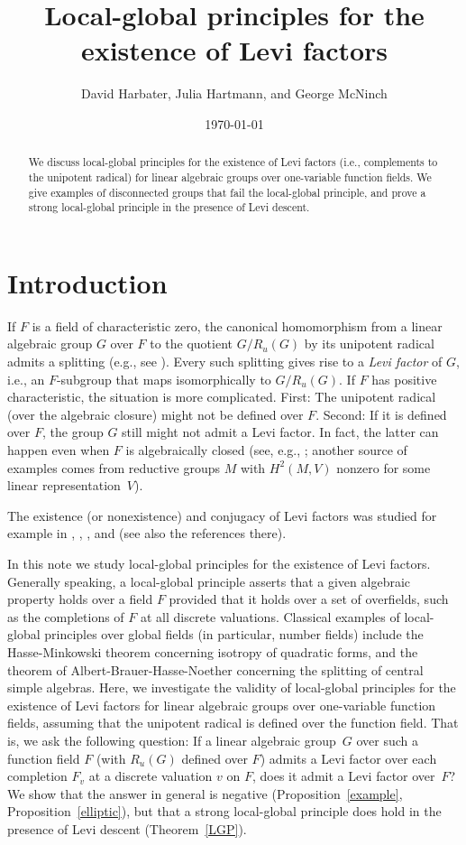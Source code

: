 \documentclass[12pt]{amsart}
\title{Local-global principles for the existence of Levi factors}
\author{David Harbater, Julia Hartmann, and George McNinch}
\date{\today}
\theoremstyle{plain}
\theoremstyle{definition}
\theoremstyle{remark}
\begin{document}
\maketitle

\begin{abstract}
We discuss local-global principles for the existence of Levi factors (i.e., complements to the unipotent radical) for linear algebraic groups over one-variable function fields. We give examples of disconnected groups that fail the local-global principle, and prove a strong local-global principle in the presence of Levi descent.
\end{abstract}


\section{Introduction}
If $F$ is a field of characteristic zero, the canonical homomorphism from a linear algebraic group $G$ over $F$ to the quotient $G/R_u(G)$ by its unipotent radical admits a splitting (e.g., see \cite[Section~3.1]{McNinch10}). Every such splitting gives rise to a {\em Levi factor} of $G$, i.e., an $F$-subgroup that maps isomorphically to $G/R_u(G)$. If $F$ has positive characteristic, the situation is more complicated. First: The unipotent radical (over the algebraic closure) might not be defined over $F$. Second: If it is defined over $F$, the group $G$ still might not admit a Levi factor. In fact, the latter can happen even when $F$ is algebraically closed (see, e.g., \cite[Proposition~A.6.4]{CGP}; another source of examples comes from reductive groups $M$ with $H^2(M,V)$ nonzero for some linear representation~$V$). 

The existence (or nonexistence) and conjugacy of Levi factors was studied for example in \cite{Humphreys}, \cite{McNinch10}, \cite{McNinch13}, and \cite{McNinch} (see also the references there).

In this note we study local-global principles for the existence of Levi factors.  Generally speaking, a local-global principle asserts that a given algebraic property holds over a field $F$ provided that it holds over a set of overfields, such as the completions of $F$ at all discrete valuations.  Classical examples of local-global principles over global fields (in particular, number fields) include the Hasse-Minkowski theorem concerning isotropy of quadratic forms, and the theorem of Albert-Brauer-Hasse-Noether concerning the splitting of central simple algebras.  Here, we investigate the validity of local-global principles for the existence of Levi factors for linear algebraic groups over one-variable function fields, assuming that the unipotent radical is defined over the function field.  That is, we ask the following question: If a linear algebraic group~$G$ over such a function field $F$ (with $R_u(G)$ defined over $F$) admits a Levi factor over each completion $F_v$ at a discrete valuation $v$ on $F$, does it admit a Levi factor over~$F$? We show that the answer in general is negative (Proposition~\ref{example}, Proposition~\ref{elliptic}), but that a strong local-global principle does hold in the presence of Levi descent (Theorem~\ref{LGP}).
\end{document}
